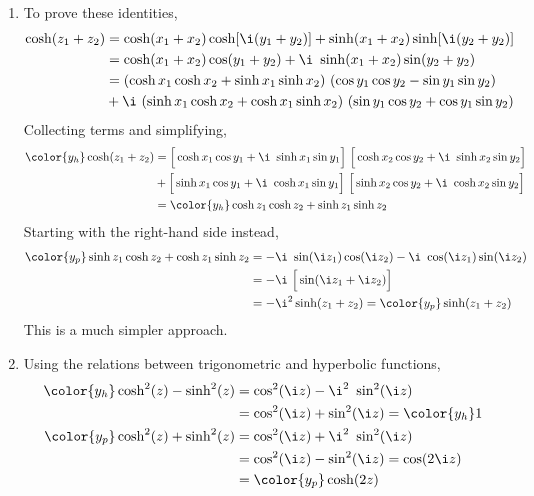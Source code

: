 \begin{enumerate}
    \item To prove these identities,
          \begin{align}
              \cosh(z_1 + z_2) & = \cosh(x_1 + x_2)\cosh[\i (y_1 + y_2)]
              + \sinh(x_1 + x_2)\sinh[\i (y_2 + y_2)]                              \\
                               & = \cosh(x_1 + x_2)\cos (y_1 + y_2)
              + \i\ \sinh(x_1 + x_2)\sin (y_2 + y_2)                               \\
                               & = (\cosh x_1 \cosh x_2 + \sinh x_1 \sinh x_2)
              \ (\cos y_1 \cos y_2 - \sin y_1 \sin y_2)                            \\
                               & + \i\ (\sinh x_1 \cosh x_2 + \cosh x_1 \sinh x_2)
              \ (\sin y_1 \cos y_2 + \cos y_1 \sin y_2)
          \end{align}
          Collecting terms and simplifying,
          \begin{align}
              \color{y_h}\cosh(z_1 + z_2) & = \Big[\cosh x_1 \cos y_1
                  + \i\ \sinh x_1 \sin y_1\Big]
              \ \Big[ \cosh x_2 \cos y_2 + \i\ \sinh x_2 \sin y_2 \Big] \\
                                          & + \Big[\sinh x_1 \cos y_1
                  + \i\ \cosh x_1 \sin y_1\Big]
              \ \Big[ \sinh x_2 \cos y_2 + \i\ \cosh x_2 \sin y_2 \Big] \\
                                          & = \color{y_h}
              \cosh z_1 \cosh z_2 + \sinh z_1 \sinh z_2
          \end{align}
          Starting with the right-hand side instead,
          \begin{align}
              \color{y_p}\sinh z_1 \cosh z_2 + \cosh z_1 \sinh z_2 & =
              -\i\ \sin(\i z_1) \cos(\i z_2) -\i\ \cos(\i z_1) \sin(\i z_2) \\
                                                                   & =
              -\i\ \Big[ \sin(\i z_1 + \i z_2) \Big]                        \\
                                                                   & =
              -\i^2 \sinh(z_1 + z_2) = \color{y_p}\sinh(z_1 + z_2)
          \end{align}
          This is a much simpler approach.

    \item Using the relations between trigonometric and hyperbolic functions,
          \begin{align}
              \color{y_h} \cosh^2(z)
              - \sinh^2(z) & = \cos^2(\i z) - \i^2\ \sin^2(\i z)           \\
                           & = \cos^2(\i z) + \sin^2(\i z) = \color{y_h} 1 \\
              \color{y_p} \cosh^2(z)
              + \sinh^2(z) & = \cos^2(\i z) + \i^2\ \sin^2(\i z)           \\
                           & = \cos^2(\i z) - \sin^2(\i z) = \cos(2\i z)   \\
                           & = \color{y_p} \cosh(2z)
          \end{align}


\end{enumerate}
